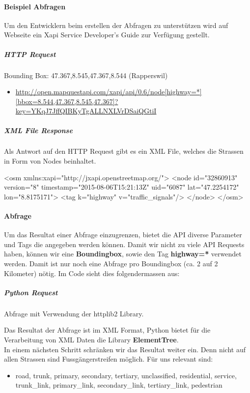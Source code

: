 \paragraph{Beispiel Abfragen}
Um den Entwicklern beim erstellen der Abfragen zu unterstützen wird auf Webseite \cite{mapquestapi} ein Xapi Service Developer's Guide zur Verfügung gestellt.

\subparagraph{HTTP Request}
Bounding Box:  47.367,8.545,47.367,8.544 (Rapperswil)
\begin{itemize}
	\item \url{http://open.mapquestapi.com/xapi/api/0.6/node[highway=*][bbox=8.544,47.367,8.545,47.367]?key=YKqJ7JffQIBKyTgALLNXLVrDSaiQGtiI}
\end{itemize}

\newpage
\subparagraph{XML File Response}
Als Antwort auf den HTTP Request gibt es ein XML File, welches die Strassen in Form von Nodes beinhaltet.\\

\begin{python}
	<osm xmlns:xapi="http://jxapi.openstreetmap.org/">
	<node id="32860913" version="8"
	timestamp="2015-08-06T15:21:13Z" uid="6087"
	lat="47.2254172" lon="8.8175171">
	<tag k="highway" v="traffic_signals"/>
	</node>
	</osm>
\end{python}



\paragraph{Abfrage}
Um das Resultat einer Abfrage einzugrenzen, bietet die API diverse Parameter und Tags die angegeben werden können. Damit wir nicht zu viele API Requests haben, können wir eine \textbf{Boundingbox}, sowie den Tag \textbf{highway=*} verwendet werden. Damit ist nur noch eine Abfrage pro Boundingbox (ca. 2 auf 2 Kilometer) nötig. Im Code sieht dies folgendermassen aus:
\subparagraph{Python Request} Abfrage mit Verwendung der httplib2 Library. \\ 
\begin{python}
import httplib2

url =  'http://open.mapquestapi.com/xapi/api/0.6/node
		[highway=*][bbox=8.544,47.367,8.545,47.367]?
		key=YKqJ7JffQIBKyTgALLNXLVrDSaiQGtiI}'
resp, content = httplib2.Http().request(url)
\end{python}

Das Resultat der Abfrage ist im XML Format, Python bietet für die Verarbeitung von XML Daten die Library \textbf{ElementTree}.\\
In einem nächsten Schritt schränken wir das Resultat weiter ein. Denn nicht auf allen Strassen sind Fussgängerstreifen möglich. Für uns relevant sind:
\begin{itemize}
	\item road, trunk, primary, secondary, tertiary, unclassified, residential, service, trunk\_link, primary\_link, secondary\_link, tertiary\_link, pedestrian
\end{itemize}

